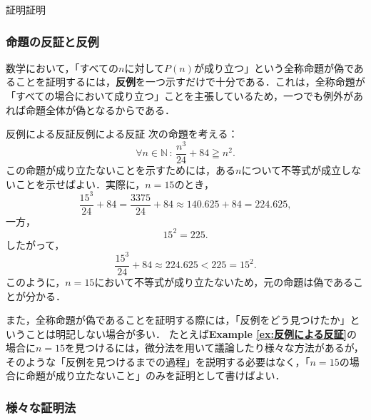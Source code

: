 \documentclass[a4paper,11pt]{ltjsarticle}
\newcommand{\exref}[1]{{\bfseries\sffamily Example \ref{ex:#1}}}
\renewcommand{\geq}{\geqq}
\begin{document}
\begin{example}{証明}{証明}
\begin{center}
    \end{center}
    \end{example}

    \subsubsection{命題の反証と反例}

    数学において，「すべての$n$に対して$P(n)$が成り立つ」という全称命題が偽であることを証明するには，\textbf{反例}を一つ示すだけで十分である．これは，全称命題が「すべての場合において成り立つ」ことを主張しているため，一つでも例外があれば命題全体が偽となるからである．

    \begin{example}{反例による反証}{反例による反証}
        次の命題を考える：
        \[
        \forall n \in \mathbb{N}\, : \, \frac{n^3}{24} + 84 \geq n^2.
        \]
        この命題が成り立たないことを示すためには，ある$n$について不等式が成立しないことを示せばよい．実際に，$n = 15$のとき，
        \[
        \frac{15^3}{24} + 84 = \frac{3375}{24} + 84 \approx 140.625 + 84 = 224.625,
        \]
        一方，
        \[
        15^2 = 225.
        \]
        したがって，
        \[
        \frac{15^3}{24} + 84 \approx 224.625 < 225 = 15^2.
        \]
        このように，$n = 15$において不等式が成り立たないため，元の命題は偽であることが分かる．
    \end{example}

    また，全称命題が偽であることを証明する際には，「反例をどう見つけたか」ということは明記しない場合が多い．
    たとえば\exref{反例による反証}の場合に$n=15$を見つけるには，微分法を用いて議論したり様々な方法があるが，そのような「反例を見つけるまでの過程」を説明する必要はなく，「$n=15$の場合に命題が成り立たないこと」のみを証明として書けばよい．
    
    \subsubsection{様々な証明法}
\end{document}
